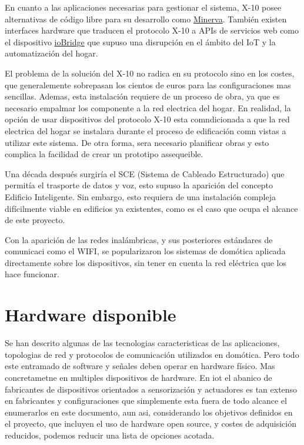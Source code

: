 En cuanto a las aplicaciones necesarias para gestionar el sistema, X-10 posee alternativas de código libre para su desarrollo como \href{http://www.minervahome.net/}{Minerva}. También existen interfaces hardware que traducen el protocolo X-10 a APIs de servicios web como el dispositivo \href{http://www.iobridge.com/}{ioBridge} que supuso una disrupción en el ámbito del IoT y la automatización del hogar.

El problema de la solución del X-10 no radica en su protocolo sino en los costes, que generalemente sobrepasan los cientos de euros para las configuraciones mas sencillas. Ademas, esta instalación requiere de un proceso de obra, ya que es necesario empalmar los componente a la red electrica del hogar. En realidad, la opción de usar dispositivos del protocolo X-10 esta comndicionada a que la red electrica del hogar se instalara durante el proceso de edificación comn vistas a utilizar este sistema. De otra forma, sera necesario planificar obras y esto complica la facilidad de crear un prototipo assequeible.

Una década después surgiría el SCE (Sistema de Cableado Estructurado) que permitía el trasporte de datos y voz, esto supuso la aparición del concepto Edificio Inteligente. Sin embargo, esto requiera de una instalación compleja difícilmente viable en edificios ya existentes, como es el caso que ocupa el alcance de este proyecto.

Con la aparición de las redes inalámbricas, y sus posteriores estándares de comunicaci como el WIFI, se popularizaron los sistemas de domótica aplicada directamente sobre los dispositivos, sin tener en cuenta la red eléctrica que los hace funcionar.


\section{Hardware disponible}
\label{ch:Capitulo2.4}

Se han descrito algunas de las tecnologias caracteristicas de las aplicaciones, topologias de red y protocolos de comunicación utilizados en domótica. Pero todo este entramado de software y señales deben operar en hardware físico. Mas concretametne en multiples dispositivos de hardware. En \gls{iot} el abanico de fabricantes de dispositivos orientados a sensorización y actuadores es tan extenso en fabricantes y configuraciones que simplemente esta fuera de todo alcance el enumerarlos en este documento, aun asi, considerando los objetivos definidos en el proyecto, que incluyen el uso de hardware open source, y costes de adquisición reducidos, podemos reducir una lista de opciones acotada.

